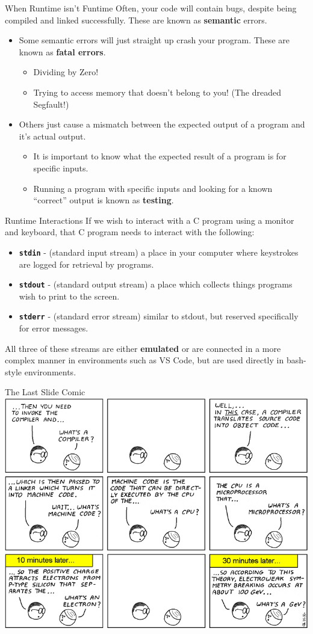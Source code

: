 \documentclass[11pt]{beamer}
\begin{document}
\begin{frame}{When Runtime isn't Funtime}
Often, your code will contain bugs, despite being compiled and linked successfully.  These are known as \textbf{semantic} errors.
\begin{itemize}
\item Some semantic errors will just straight up crash your program. These are known as \textbf{fatal errors}.
	\begin{itemize}
	\item Dividing by Zero!
	\item Trying to access memory that doesn't belong to you! (The dreaded Segfault!)
	\end{itemize}
\item Others just cause a mismatch between the expected output of a program and it's actual output.  
	\begin{itemize}
	\item It is important to know what the expected result of a program is for specific inputs.
	\item Running a program with specific inputs and looking for a known ``correct'' output is known as \textbf{testing}.
	\end{itemize}
\end{itemize}
\end{frame}

\begin{frame}{Runtime Interactions}
If we wish to interact with a C program using a monitor and keyboard, that C program needs to interact with the following:
\begin{itemize}
\item \textbf{\texttt{stdin}} - (standard input stream) a place in your computer where keystrokes are logged for retrieval by programs.
\item \textbf{\texttt{stdout}} - (standard output stream) a place which collects things programs wish to print to the screen.  
\item \textbf{\texttt{stderr}} - (standard error stream) similar to stdout, but reserved specifically for error messages.  
\end{itemize}

All three of these streams are either \textbf{emulated} or are connected in a more complex manner in environments such as VS Code, but are used directly in bash-style environments.
\end{frame}

\begin{frame}{The Last Slide Comic}
\center
\includegraphics[scale=0.3]{CompilerComic.png}
\end{frame}
\end{document}
